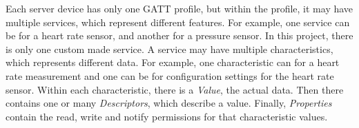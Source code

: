 Each server device has only one GATT profile, but within the profile, it may have multiple services, which represent different features. 
For example, one service can be for a heart rate sensor, and another for a pressure sensor. 
In this project, there is only one custom made service. 
A service may have multiple characteristics, which represents different data. 
For example, one characteristic can for a heart rate measurement and one can be for configuration settings for the heart rate sensor.
Within each characteristic, there is a \textit{Value}, the actual data. 
Then there contains one or many \textit{Descriptors}, which describe a value. 
Finally, \textit{Properties} contain the read, write and notify permissions for that characteristic values.\\
